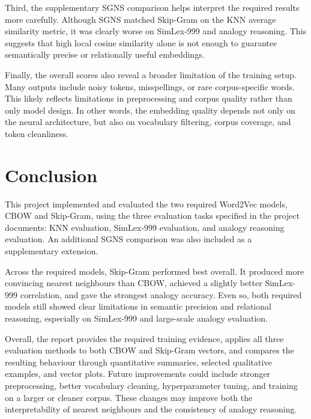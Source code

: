 \documentclass[11pt,a4paper]{article}
\begin{document}
Third, the supplementary SGNS comparison helps interpret the required results more carefully. Although SGNS matched Skip-Gram on the KNN average similarity metric, it was clearly worse on SimLex-999 and analogy reasoning. This suggests that high local cosine similarity alone is not enough to guarantee semantically precise or relationally useful embeddings.

Finally, the overall scores also reveal a broader limitation of the training setup. Many outputs include noisy tokens, misspellings, or rare corpus-specific words. This likely reflects limitations in preprocessing and corpus quality rather than only model design. In other words, the embedding quality depends not only on the neural architecture, but also on vocabulary filtering, corpus coverage, and token cleanliness.

\section{Conclusion}
This project implemented and evaluated the two required Word2Vec models, CBOW and Skip-Gram, using the three evaluation tasks specified in the project documents: KNN evaluation, SimLex-999 evaluation, and analogy reasoning evaluation. An additional SGNS comparison was also included as a supplementary extension.

Across the required models, Skip-Gram performed best overall. It produced more convincing nearest neighbours than CBOW, achieved a slightly better SimLex-999 correlation, and gave the strongest analogy accuracy. Even so, both required models still showed clear limitations in semantic precision and relational reasoning, especially on SimLex-999 and large-scale analogy evaluation.

Overall, the report provides the required training evidence, applies all three evaluation methods to both CBOW and Skip-Gram vectors, and compares the resulting behaviour through quantitative summaries, selected qualitative examples, and vector plots. Future improvements could include stronger preprocessing, better vocabulary cleaning, hyperparameter tuning, and training on a larger or cleaner corpus. These changes may improve both the interpretability of nearest neighbours and the consistency of analogy reasoning.
\end{document}
